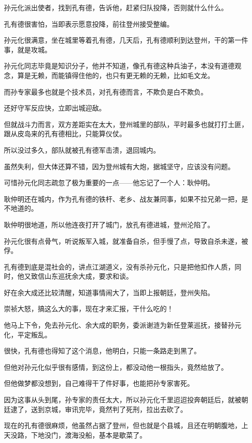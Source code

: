 \begin{multicols}{\theparacolNo}
		孙元化派出使者，找到孔有德，告诉他，赶紧归队投降，否则就什么什么。

		孔有德很害怕，当即表示愿意投降，前往登州接受整编。

		孙元化很满意，坐在城里等着孔有德，几天后，孔有德顺利到达登州，干的第一件事，就是攻城。

		孙元化同志毕竟是知识分子，他并不知道，像孔有德这种兵油子，本没有道德观念，算是无赖，而能镇得住他的，也只有更无赖的无赖，比如毛文龙。

		而孙专家最多也就是个技术员，对孔有德而言，不欺负是白不欺负。

		还好守军反应快，立即出城迎敌。

		但就战斗力而言，双方差距实在太大，登州城里的部队，平时最多也就打打土匪，跟从皮岛来的孔有德相比，只能算仪仗。

		所以没过多久，部队就被孔有德军击溃，退回城内。

		虽然失利，但大体还算不错，因为登州城有大炮，据城坚守，应该没有问题。

		可惜孙元化同志疏忽了极为重要的一点——他忘记了一个人：耿仲明。

		耿仲明还在城内，作为孔有德的铁杆、老乡、战友兼同事，如果不拉兄弟一把，是不地道的。

		耿仲明很地道，所以他连夜打开了城门，放孔有德进城，登州沦陷了。

		孙元化很有点骨气，听说叛军入城，就准备自杀，但手慢了点，导致自杀未遂，被俘。

		孔有德到底是混社会的，讲点江湖道义，没有杀孙元化，只是把他扣作人质，同时，他又致信山东巡抚余大成，要求和谈。

		好在余大成还比较清醒，知道事情闹大了，当即上报朝廷，登州失陷。

		崇祯大怒，搞这么大的事，现在才来汇报，干什么吃的！

		他马上下令，免去孙元化、余大成的职务，委派谢涟为新任登莱巡抚，接替孙元化，平定叛乱。

		很快，孔有德也得知了这个消息，他明白，只能一条路走到黑了。

		但他对孙元化似乎很有感情，到这份上，都没动他一根指头，竟然给放了。

		但他做梦都没想到，自己难得干了件好事，也能把孙专家害死。

		因为这事从头到尾，孙专家的责任太大，所以孙元化千里迢迢投奔朝廷后，就被朝廷逮了，送到京城，审讯完毕，竟然判了死刑，拉出去砍了。

		现在的孔有德很麻烦，他虽然占据了登州，但也就是个县城，且还在明朝腹地，上天没路，下地没门，渡海没船，基本是歇菜了。


\end{multicols}
